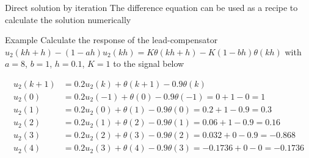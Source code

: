 \documentclass[presentation,aspectratio=1610]{beamer}
\begin{document}
\begin{frame}[label={sec:orgfde4f26}]{Direct solution by iteration}
The difference equation can be used as a recipe to calculate the solution numerically

\alert{Example} Calculate the response of the lead-compensator \(u_2(kh+h) - (1-ah)u_2(kh) = K\theta(kh+h) - K(1-bh)\theta(kh)\) with \(a=8\), \(b=1\), \(h=0.1\), \(K=1\)
to the signal below
\begin{center}
\end{center}
\begin{align*}
     u_2(k+1) &= 0.2u_2(k) + \theta(k+1) - 0.9\theta(k)\\
     u_2(0) &= 0.2u_2(-1) + \theta(0) - 0.9\theta(-1) = 0 + 1 -0 = 1\\
     u_2(1) &= 0.2u_2(0) + \theta(1) - 0.9\theta(0) = 0.2 + 1 - 0.9 = 0.3\\
     u_2(2) &= 0.2u_2(1) + \theta(2) - 0.9\theta(1) = 0.06 + 1 - 0.9 = 0.16\\
     u_2(3) &= 0.2u_2(2) + \theta(3) - 0.9\theta(2) = 0.032 + 0 - 0.9 = -0.868\\
     u_2(4) &= 0.2u_2(3) + \theta(4) - 0.9\theta(3) = -0.1736 + 0 - 0 = -0.1736\\
\end{align*}
\end{frame}
\end{document}
